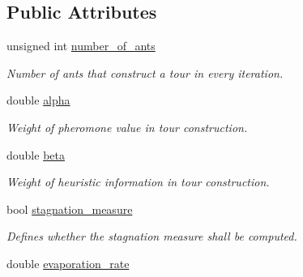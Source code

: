 \subsection*{Public Attributes}
\begin{CompactItemize}
\item 
\hypertarget{classAntColonyConfiguration_3f18abe4272a3281947370750aa24a25}{
unsigned int \hyperlink{classAntColonyConfiguration_3f18abe4272a3281947370750aa24a25}{number\_\-of\_\-ants}}
\label{classAntColonyConfiguration_3f18abe4272a3281947370750aa24a25}

\begin{CompactList}\small\item\em Number of ants that construct a tour in every iteration. \item\end{CompactList}\item 
\hypertarget{classAntColonyConfiguration_dc25fc4205fe334a1715995aca9a32fd}{
double \hyperlink{classAntColonyConfiguration_dc25fc4205fe334a1715995aca9a32fd}{alpha}}
\label{classAntColonyConfiguration_dc25fc4205fe334a1715995aca9a32fd}

\begin{CompactList}\small\item\em Weight of pheromone value in tour construction. \item\end{CompactList}\item 
\hypertarget{classAntColonyConfiguration_bc3f9eeb6f15d3d3712b8a3640397a11}{
double \hyperlink{classAntColonyConfiguration_bc3f9eeb6f15d3d3712b8a3640397a11}{beta}}
\label{classAntColonyConfiguration_bc3f9eeb6f15d3d3712b8a3640397a11}

\begin{CompactList}\small\item\em Weight of heuristic information in tour construction. \item\end{CompactList}\item 
\hypertarget{classAntColonyConfiguration_3fcc35d156f648a68435418e8ad5a576}{
bool \hyperlink{classAntColonyConfiguration_3fcc35d156f648a68435418e8ad5a576}{stagnation\_\-measure}}
\label{classAntColonyConfiguration_3fcc35d156f648a68435418e8ad5a576}

\begin{CompactList}\small\item\em Defines whether the stagnation measure shall be computed. \item\end{CompactList}\item 
\hypertarget{classAntColonyConfiguration_d75d81f5beb7e47b572c53792500cd6d}{
double \hyperlink{classAntColonyConfiguration_d75d81f5beb7e47b572c53792500cd6d}{evaporation\_\-rate}}
\label{classAntColonyConfiguration_d75d81f5beb7e47b572c53792500cd6d}


\end{CompactItemize}
